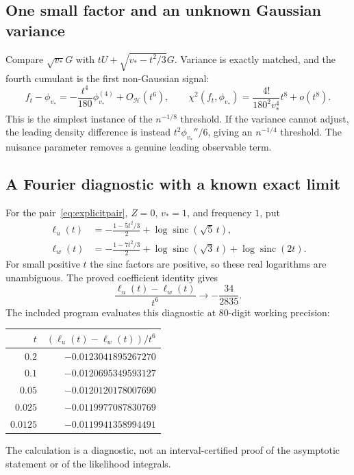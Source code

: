 \documentclass[11pt,a4paper]{article}
\numberwithin{equation}{section}
\theoremstyle{definition}
\theoremstyle{remark}
\newcommand{\sinc}{\operatorname{sinc}}
\begin{document}
\subsection{One small factor and an unknown Gaussian variance}
Compare $\sqrt{v_*}G$ with $tU+\sqrt{v_*-t^2/3}G$. Variance is exactly
matched, and the fourth cumulant is the first non-Gaussian signal:
\begin{equation}
 f_t-\phi_{v_*}=-\frac{t^4}{180}\phi_{v_*}^{(4)}+O_{\mathcal H}(t^6),
 \qquad
 \chi^2(f_t,\phi_{v_*})
   =\frac{4!}{180^2v_*^4}t^8+o(t^8).
\end{equation}
This is the simplest instance of the $n^{-1/8}$ threshold. If the variance
cannot adjust, the leading density difference is instead
$t^2\phi_{v_*}''/6$, giving an $n^{-1/4}$ threshold. The nuisance parameter
removes a genuine leading observable term.

\subsection{A Fourier diagnostic with a known exact limit}
For the pair~\eqref{eq:explicitpair}, $Z=0$, $v_*=1$, and frequency $1$, put
\begin{align}
 \ell_u(t)&=-\frac{1-5t^2/3}{2}+\log\sinc(\sqrt5\,t),\\
 \ell_w(t)&=-\frac{1-7t^2/3}{2}
                 +\log\sinc(\sqrt3\,t)+\log\sinc(2t).
\end{align}
For small positive $t$ the sinc factors are positive, so these real logarithms
are unambiguous. The proved coefficient identity gives
\begin{equation}
 \frac{\ell_u(t)-\ell_w(t)}{t^6}\longrightarrow-\frac{34}{2835}.
\end{equation}
The included program evaluates this diagnostic at 80-digit working precision:
\begin{center}
\begin{tabular}{@{}rr@{}}
\toprule
$t$ & $(\ell_u(t)-\ell_w(t))/t^6$\\
\midrule
$0.2$ & $-0.0123041895267270$\\
$0.1$ & $-0.0120695349593127$\\
$0.05$ & $-0.0120120178007690$\\
$0.025$ & $-0.0119977087830769$\\
$0.0125$ & $-0.0119941358994491$\\
\bottomrule
\end{tabular}
\end{center}
The calculation is a diagnostic, not an interval-certified proof of the
asymptotic statement or of the likelihood integrals.
\end{document}
